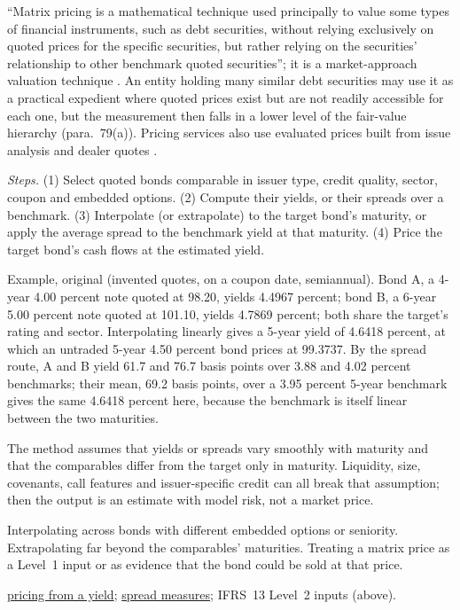 \begin{qfmethod}\label{meth:matrix-pricing}
 ``Matrix pricing is a mathematical technique used principally to value some types of financial instruments, such as debt securities, without relying exclusively on quoted prices for the specific securities, but rather relying on the securities' relationship to other benchmark quoted securities''; it is a market-approach valuation technique \citep[IFRS~13, para.~B7]{eu-2023-1803-ifrs13}. An entity holding many similar debt securities may use it as a practical expedient where quoted prices exist but are not readily accessible for each one, but the measurement then falls in a lower level of the fair-value hierarchy (para.~79(a)). Pricing services also use evaluated prices built from issue analysis and dealer quotes \citep[chap.~44, p.~1119]{s7-fabozzifixed}.

\emph{Steps.} (1) Select quoted bonds comparable in issuer type, credit quality, sector, coupon and embedded options. (2) Compute their yields, or their spreads over a benchmark. (3) Interpolate (or extrapolate) to the target bond's maturity, or apply the average spread to the benchmark yield at that maturity. (4) Price the target bond's cash flows at the estimated yield.

 Example, original (invented quotes, on a coupon date, semiannual). Bond A, a 4-year 4.00 percent note quoted at 98.20, yields 4.4967 percent; bond B, a 6-year 5.00 percent note quoted at 101.10, yields 4.7869 percent; both share the target's rating and sector. Interpolating linearly gives a 5-year yield of 4.6418 percent, at which an untraded 5-year 4.50 percent bond prices at 99.3737. By the spread route, A and B yield 61.7 and 76.7 basis points over 3.88 and 4.02 percent benchmarks; their mean, 69.2 basis points, over a 3.95 percent 5-year benchmark gives the same 4.6418 percent here, because the benchmark is itself linear between the two maturities.

 The method assumes that yields or spreads vary smoothly with maturity and that the comparables differ from the target only in maturity. Liquidity, size, covenants, call features and issuer-specific credit can all break that assumption; then the output is an estimate with model risk, not a market price.

 Interpolating across bonds with different embedded options or seniority. Extrapolating far beyond the comparables' maturities. Treating a matrix price as a Level~1 input or as evidence that the bond could be sold at that price.

 \hyperref[meth:bond-price-from-yield]{pricing from a yield}; \hyperref[def:bond-yield-spread-measures]{spread measures}; IFRS~13 Level~2 inputs (above).

\end{qfmethod}

